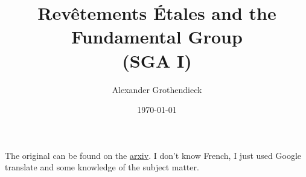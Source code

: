 \documentclass{amsbook}
\title{Rev\^etements \'Etales and the Fundamental Group\\(SGA I)}
\author{Alexander Grothendieck}
\date{\today}
\begin{document}
\maketitle
\tableofcontents{}

The original can be found on the \href{https://arxiv.org/abs/math/0206203}{arxiv}. I don't know French, I just used Google translate and some knowledge of the subject matter.


\end{document}
